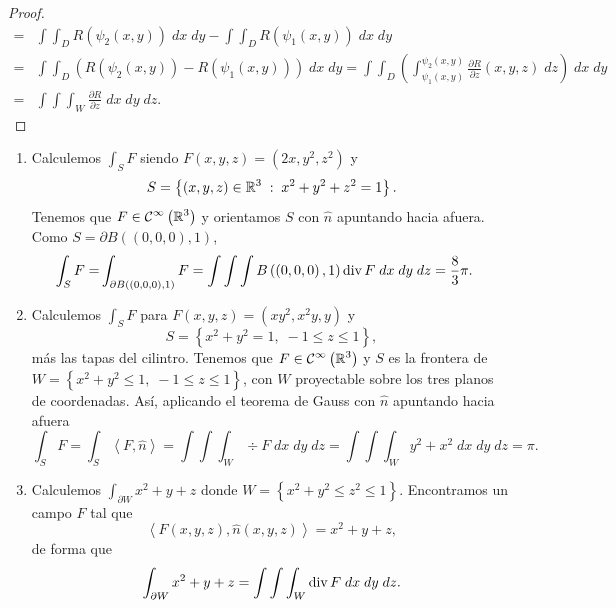 \begin{proof}
\[\begin{split}
	= & \int \int _{D}R\left(\psi_{2}\left(x,y\right)\right) \; dx \; dy-\int \int _{D}R\left(\psi_{1}\left(x,y\right)\right) \; dx \; dy \\
	= & \int \int _{D}\left(R\left(\psi_{2}\left(x,y\right)\right)-R\left(\psi_{1}\left(x,y\right)\right)\right) \; dx \; dy = \int \int _{D}\left(\int^{\psi_{2}\left(x,y\right)}_{\psi_{1}\left(x,y\right)} \frac{\partial R}{\partial z}\left(x,y,z\right) \; dz\right) \; dx \; dy\\
	= & \int \int \int _{W}\frac{\partial R}{\partial z } \; dx \; dy \; dz .
\end{split}
\]
\end{proof}
\begin{eg}
\begin{enumerate}
\item Calculemos $\displaystyle \int _{S}F  $ siendo $\displaystyle F\left(x,y,z\right)=\left(2x, y^{2}, z^{2}\right) $ y 
	\[S = \left\{ \left(x,y,z\right)\in \mathbb{R}^{3} \; : \; x^{2}+y^{2}+z^{2}= 1\right\}  .\]
	Tenemos que $\displaystyle F \in \mathcal{C}^{\infty}\left(\mathbb{R}^{3}\right) $ y orientamos $\displaystyle S $ con $\displaystyle \hat{n} $ apuntando hacia afuera. Como $\displaystyle S = \partial B\left(\left(0,0,0\right), 1\right) $,
	\[
	\begin{split}
		\int _{S}F = & \int _{\partial B\left(\left(0,0,0\right), 1\right)} F = \int \int \int B\left(\left(0,0,0\right), 1\right)\operatorname{div} F \; dx \; dy \; dz  = \frac{8}{3}\pi .
	\end{split}
	\]
\item Calculemos $\displaystyle \int _{S}F  $ para $\displaystyle F\left(x,y,z\right)=\left(xy^{2}, x^{2}y, y\right) $ y 
	\[S = \left\{ x^{2}+y^{2} = 1, \; - 1 \leq z \leq 1\right\}  ,\]
	más las tapas del cilintro. Tenemos que $\displaystyle F \in \mathcal{C}^{\infty}\left(\mathbb{R}^{3}\right) $ y $\displaystyle S $ es la frontera de $\displaystyle W = \left\{ x^{2}+y^{2}\leq 1, \; - 1\leq z \leq 1\right\}  $, con $\displaystyle W $ proyectable sobre los tres planos de coordenadas. Así, aplicando el teorema de Gauss con $\displaystyle \hat{n} $ apuntando hacia afuera
	\[\int _{S}F = \int _{S}\left\langle F, \hat{n} \right\rangle  =\int \int \int _{W}\div F \; dx \; dy \; dz = \int \int \int _{W}y^{2}+x^{2} \; dx \; dy \; dz = \pi  .\]
\item Calculemos $\displaystyle \int _{\partial W}x^{2}+y+z  $ donde $\displaystyle W = \left\{ x^{2}+y^{2}\leq z^{2}\leq 1\right\}  $. Encontramos un campo $\displaystyle F $ tal que 
	\[\left\langle F\left(x,y,z\right), \hat{n}\left(x,y,z\right) \right\rangle =x^{2}+y+z ,\]
	de forma que 
	\[\int _{\partial W}x^{2}+y+z = \int \int \int _{W}\operatorname{div} F \; dx \; dy \; dz .\]
\end{enumerate}
\end{eg}
